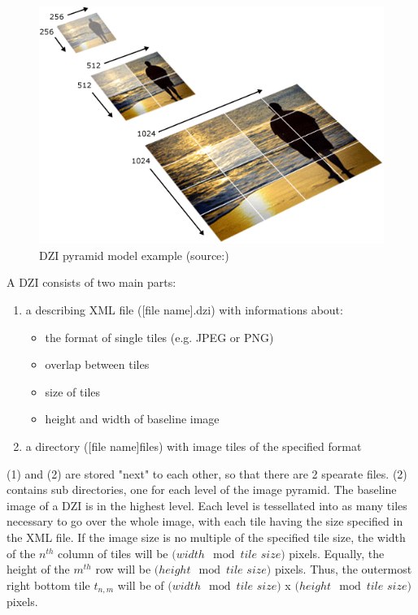 \begin{figure}[H]
	\begin{center}
		\includegraphics[scale=0.4]{img/dzi_pyramid.png}
		\caption{DZI pyramid model example (source:\cite{web:dzi})}
		\label{fig:fig2.2}
	\end{center}
\end{figure}

A DZI consists of two main parts\cite{web:dzi}: 
\begin{enumerate}[(1)]
	\item a describing XML file ([file name].dzi) with informations about:
	\begin{itemize}
		\item the format of single tiles (e.g. JPEG or PNG)
		\item overlap between tiles
		\item size of tiles
		\item height and width of baseline image
	\end{itemize}
	\item a directory ([file name]{\textunderscore}files) with image tiles of the specified format
\end{enumerate}

(1) and (2) are stored "next" to each other, so that there are 2 spearate files. (2) contains sub directories, one for each level of the image pyramid. The baseline image of a DZI is in the highest level. Each level is tessellated into as many tiles necessary to go over the whole image, with each tile having the size specified in the XML file. If the image size is no multiple of the specified tile size, the width of the $n^{th}$ column of tiles will be $(width \mod tile$ $size)$ pixels. Equally, the height of the $m^{th}$ row will be $(height \mod tile$ $size)$ pixels. Thus, the outermost right bottom tile $t_{n,m}$ will be of $(width \mod tile$ $size)$ x $(height \mod tile$ $size)$ pixels.


